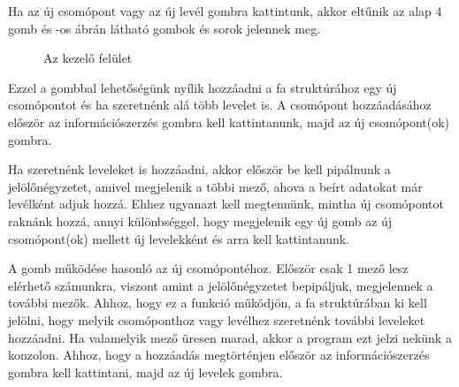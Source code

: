 Ha az új csomópont vagy az új levél gombra kattintunk, akkor eltűnik az alap 4 gomb és -os ábrán látható gombok és sorok jelennek meg.

\begin{figure} [H]
	\centering
	\caption{Az kezelő felület}
	\label{fig:modify_screen}
\end{figure}


Ezzel a gombbal lehetőségünk nyílik hozzáadni a fa struktúrához egy új csomópontot és ha szeretnénk alá több levelet is. A csomópont hozzáadásához először az információszerzés gombra kell kattintanunk, majd az új csomópont(ok) gombra.

Ha szeretnénk leveleket is hozzáadni, akkor először be kell pipálnunk a jelölőnégyzetet, amivel megjelenik a többi mező, ahova a beírt adatokat már levélként adjuk hozzá. Ehhez ugyanazt kell megtennünk, mintha új csomópontot raknánk hozzá, annyi különbséggel, hogy megjelenik egy új gomb az új csomópont(ok) mellett új levelekként és arra kell kattintanunk. 


A gomb működése hasonló az új csomópontéhoz. Először csak 1 mező lesz elérhető számunkra, viszont amint a jelölőnégyzetet bepipáljuk, megjelennek a további mezők. Ahhoz, hogy ez a funkció működjön, a fa struktúrában ki kell jelölni, hogy melyik csomóponthoz vagy levélhez szeretnénk további leveleket hozzáadni. Ha valamelyik mező üresen marad, akkor a program ezt jelzi nekünk a konzolon. Ahhoz, hogy a hozzáadás megtörténjen először az információszerzés gombra kell kattintani, majd az új levelek gombra.

